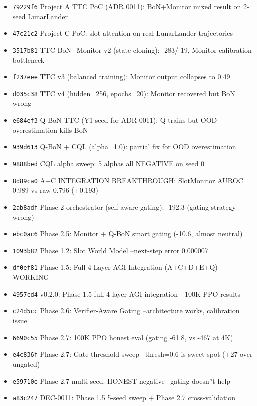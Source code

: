 \documentclass[11pt]{article}
\begin{document}
\begin{itemize}
  \item \texttt{79229f6} Project A TTC PoC (ADR 0011): BoN+Monitor mixed result on 2-seed LunarLander
  \item \texttt{47c21c2} Project C PoC: slot attention on real LunarLander trajectories
  \item \texttt{3517b81} TTC BoN+Monitor v2 (state cloning): -283/-19, Monitor calibration bottleneck
  \item \texttt{f237eee} TTC v3 (balanced training): Monitor output collapses to 0.49
  \item \texttt{d035c38} TTC v4 (hidden=256, epochs=20): Monitor recovered but BoN wrong
  \item \texttt{e684ef3} Q-BoN TTC (Y1 seed for ADR 0011): Q trains but OOD overestimation kills BoN
  \item \texttt{939d613} Q-BoN + CQL (alpha=1.0): partial fix for OOD overestimation
  \item \texttt{9888bed} CQL alpha sweep: 5 alphas all NEGATIVE on seed 0
  \item \texttt{8d89ca0} A+C INTEGRATION BREAKTHROUGH: SlotMonitor AUROC 0.989 vs raw 0.796 (+0.193)
  \item \texttt{2ab8adf} Phase 2 orchestrator (self-aware gating): -192.3 (gating strategy wrong)
  \item \texttt{ebc0ac6} Phase 2.5: Monitor + Q-BoN smart gating (-10.6, almost neutral)
  \item \texttt{1093b82} Phase 1.2: Slot World Model --next-step error 0.000007
  \item \texttt{df0ef81} Phase 1.5: Full 4-Layer AGI Integration (A+C+D+E+Q) --WORKING
  \item \texttt{4957cd4} v0.2.0: Phase 1.5 full 4-layer AGI integration - 100K PPO results
  \item \texttt{c24d5cc} Phase 2.6: Verifier-Aware Gating --architecture works, calibration issue
  \item \texttt{6690c55} Phase 2.7: 100K PPO honest eval (gating -61.8, vs -467 at 4K)
  \item \texttt{e4c836f} Phase 2.7: Gate threshold sweep --thresh=0.6 is sweet spot (+27 over ungated)
  \item \texttt{e59710e} Phase 2.7 multi-seed: HONEST negative --gating doesn''t help
  \item \texttt{a83c247} DEC-0011: Phase 1.5 5-seed sweep + Phase 2.7 cross-validation
\end{itemize}
\end{document}

